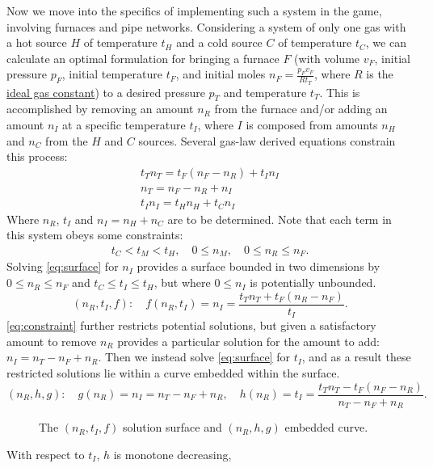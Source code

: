 \documentclass{article}
\begin{document}
Now we move into the specifics of implementing such a system in the game,
involving furnaces and pipe networks.
Considering a system of only one gas with
a hot source $H$ of temperature $t_H$ and
a cold source $C$ of temperature $t_C$,
we can calculate an optimal formulation for bringing a furnace $F$
(with volume $v_F$, initial pressure $p_F$, initial temperature $t_F$,
and initial moles $n_F=\frac{p_F v_F}{R t_T}$, where
$R$ is the \href{https://en.wikipedia.org/wiki/Gas_constant}{ideal gas constant})
to a desired pressure $p_T$ and temperature $t_T$.
This is accomplished by removing an amount $n_R$ from the furnace and/or adding
an amount $n_I$ at a specific temperature $t_I$, where $I$ is composed from
amounts $n_H$ and $n_C$ from the $H$ and $C$ sources.
Several gas-law derived equations constrain this process:
\begin{gather}
    t_T n_T = t_F(n_F-n_R)+t_I n_I \label{eq:surface} \\
    n_T = n_F-n_R+n_I \label{eq:constraint} \\
    t_I n_I = t_H n_H+t_C n_I \label{eq:added}
\end{gather}
Where $n_R$, $t_I$ and $n_I=n_H+n_C$ are to be determined.
Note that each term in this system obeys some constraints:
\begin{gather*}
    t_C<t_M<t_H,\quad
    0\le n_M,\quad
    0\le n_R\le n_F.
\end{gather*}
Solving \autoref{eq:surface} for $n_I$ provides
a surface bounded in two dimensions
by $0\le n_R\le n_F$ and $t_C\le t_I\le t_H$,
but where $0\le n_I$ is potentially unbounded.
\[
    (n_R,t_I,f):\quad
    f(n_R,t_I) = n_I = \frac{t_T n_T+t_F(n_R-n_F)}{t_I}.
\]
\autoref{eq:constraint} further restricts potential solutions, but
given a satisfactory amount to remove $n_R$ provides a particular solution
for the amount to add: $n_I=n_T-n_F+n_R$.
Then we instead solve \autoref{eq:surface} for $t_I$,
and as a result these restricted solutions lie
within a curve embedded within the surface.
\[
    (n_R,h,g):\quad
    g(n_R) = n_I = n_T-n_F+n_R,\quad
    h(n_R) = t_I = \frac{t_T n_T-t_F(n_F-n_R)}{n_T-n_F+n_R}.
\]
\begin{figure}
    \begin{center}
    \end{center}
    \caption[]{%
        The $(n_R,t_I,f)$ solution surface
        and $(n_R,h,g)$ embedded curve.
    }
    \label{fig:surface}
\end{figure}
\noindent
With respect to $t_I$, $h$ is monotone decreasing,
\end{document}
